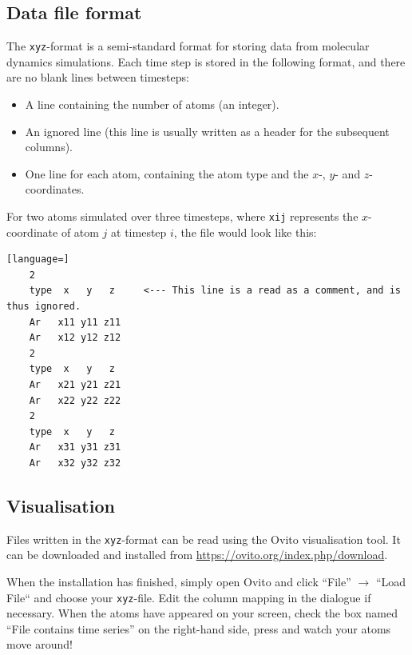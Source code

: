\documentclass[11pt,british,a4paper]{report}
\begin{document}
\subsection{Data file format}\label{app:xyz}
The \texttt{xyz}-format is a semi-standard format for storing data from molecular dynamics simulations. Each time step is stored in the following format, and there are no blank lines between timesteps:
\begin{itemize}
    \item A line containing the number of atoms (an integer).
    \item An ignored line (this line is usually written as a header for the subsequent columns).
    \item One line for each atom, containing the atom type and the \(x\)-, \(y\)- and \(z\)-coordinates.
\end{itemize}
For two atoms simulated over three timesteps, where \texttt{xij} represents the \(x\)-coordinate of atom \(j\) at timestep \(i\), the file would look like this:
\begin{lstlisting}[language=]
    2
    type  x   y   z     <--- This line is a read as a comment, and is thus ignored.
    Ar   x11 y11 z11
    Ar   x12 y12 z12
    2
    type  x   y   z
    Ar   x21 y21 z21
    Ar   x22 y22 z22
    2
    type  x   y   z
    Ar   x31 y31 z31
    Ar   x32 y32 z32
\end{lstlisting}


\tikzexternaldisable
\subsection{Visualisation}\label{app:ovito}
Files written in the \texttt{xyz}-format can be read using the Ovito visualisation tool. It can be downloaded and installed from \url{https://ovito.org/index.php/download}.

When the installation has finished, simply open Ovito and click ``File'' \(\to\) ``Load File`` and choose your \texttt{xyz}-file. Edit the column mapping in the dialogue if necessary. When the atoms have appeared on your screen, check the box named ``File contains time series'' on the right-hand side, press  and watch your atoms move around!

\end{document}
